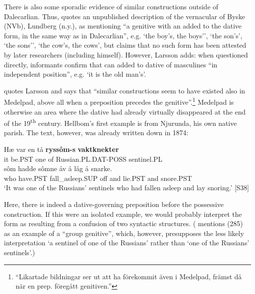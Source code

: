 {{%

There is also some sporadic evidence of similar constructions outside of Dalecarlian. Thus, \citet[124]{Larsson1929} quotes an unpublished description of the vernacular of Byske (NVb), Lundberg (n.y.), as mentioning “a genitive with an  added to the dative form, in the same way as in Dalecarlian”, e.g.  ‘the boy’s, the boys’’,  ‘the son’s’,  ‘the sons’’,  ‘the cow’s, the cows’, but claims that no such form has been attested by later researchers (including himself). However, Larsson adds: when questioned directly, informants confirm that  can added to dative of masculines “in independent position”, e.g.  ‘it is the old man’s’. 


\citet[126]{Hellbom1961} quotes Larsson and says that “similar constructions seem to have existed also in Medelpad, above all when a preposition precedes the genitive”.\footnote{ “Likartade bildningar ser ut att ha förekommit även i Medelpad, främst då när en prep. föregått genitiven.”} Medelpad is otherwise an area where the dative had already virtually disappeared at the end of the 19\textsuperscript{th} century. Hellbom’s first example is from Njurunda, his own native parish. The text, however, was already written down in 1874:


\ea\label{}
\gll Hæ  var  en  tå  \textbf{ryssôm-s}\textbf{  vaktknekter}\\
it  be.PST  one  of  Russian.PL.DAT-POSS  sentinel.PL\\
\gll sôm  hadde  sômne  åv  å  låg  å  snarke.\\
who  have.PST  fall\_asleep.SUP  off  and  lie.PST  and  snore.PST\\
\glt  ‘It was one of the Russians’ sentinels who had fallen asleep and lay snoring.’ [S38]
\z

Here, there is indeed a dative-governing preposition before the possessive construction. If this were an isolated example, we would probably interpret the form  as resulting from a confusion of two syntactic structures. (\citet[38]{Delsing2003a} mentions (285) as an example of a “group genitive”, which, however, presupposes the less likely interpretation ‘a sentinel of one of the Russians’ rather than ‘one of the Russians’ sentinels’.) 

}}

